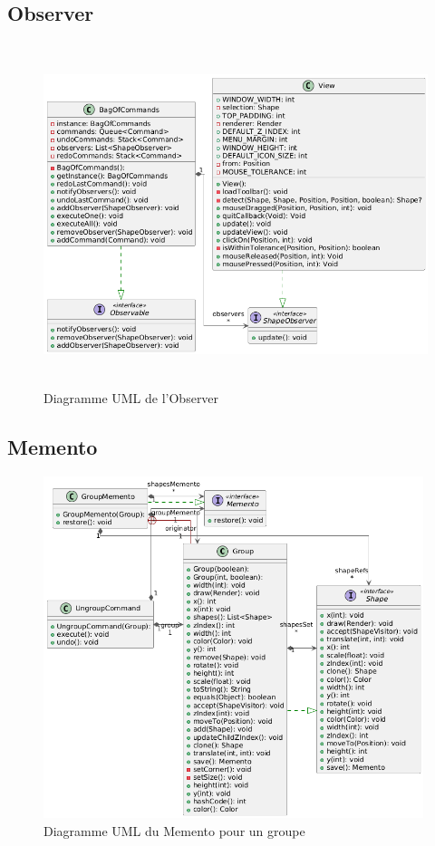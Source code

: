 \documentclass{article}
\begin{document}
\subsection{Observer}
\begin{figure}[h]
    \centering
    \includegraphics[width=\textwidth,height=10.0cm,keepaspectratio]{observer.png}
    \caption{Diagramme UML de l'Observer}
    \label{Observer}
\end{figure}
\FloatBarrier

\subsection{Memento}
\begin{figure}[h]
    \centering
    \includegraphics[width=\textwidth,height=10.0cm,keepaspectratio]{memento.png}
    \caption{Diagramme UML du Memento pour un groupe}
    \label{MementoGroupe}
\end{figure}
\FloatBarrier
\end{document}
